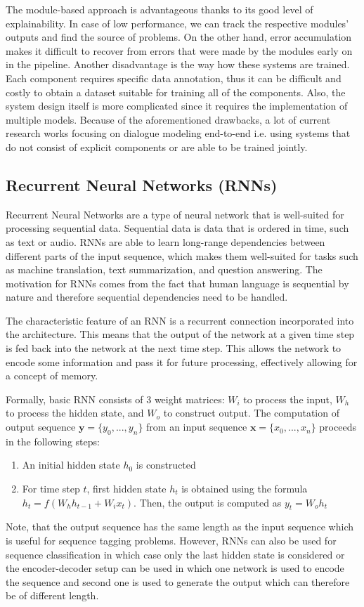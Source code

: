 The module-based approach is advantageous thanks to its good level of explainability.
In case of low performance, we can track the respective modules' outputs and find the source of problems.
On the other hand, error accumulation makes it difficult to recover from errors that were made by the modules early on in the pipeline.
Another disadvantage is the way how these systems are trained.
Each component requires specific data annotation, thus it can be difficult and costly to obtain a dataset suitable for training all of the components.
Also, the system design itself is more complicated since it requires the implementation of multiple models.
Because of the aforementioned drawbacks, a lot of current research works focusing on dialogue modeling end-to-end i.e. using systems that do not consist of explicit components or are able to be trained jointly.

\subsection{Recurrent Neural Networks (RNNs)}
Recurrent Neural Networks are a type of neural network that is well-suited for processing sequential data. Sequential data is data that is ordered in time, such as text or audio.
RNNs are able to learn long-range dependencies between different parts of the input sequence, which makes them well-suited for tasks such as machine translation, text summarization, and question answering.
The motivation for RNNs comes from the fact that human language is sequential by nature and therefore sequential dependencies need to be handled.

The characteristic feature of an RNN is a recurrent connection incorporated into the architecture.
This means that the output of the network at a given time step is fed back into the network at the next time step. This allows the network to encode some information and pass it for future processing, effectively allowing for a concept of memory.

Formally, basic RNN consists of 3 weight matrices: $W_{i}$ to process the input, $W_h$ to process the hidden state, and $W_o$ to construct output.
The computation of output sequence $\mathbf{y} = \{y_0, ..., y_n\}$ from an input sequence $\mathbf{x} = \{x_0, ..., x_n\}$ proceeds in the following steps:
\begin{enumerate}
    \item An initial hidden state $h_0$ is constructed
    \item For time step $t$, first hidden state $h_t$ is obtained using the formula $h_t = f(W_hh_{t-1} + W_ix_t)$. Then, the output is computed as $y_t = W_oh_t$
\end{enumerate}
Note, that the output sequence has the same length as the input sequence which is useful for sequence tagging problems.
However, RNNs can also be used for sequence classification in which case only the last hidden state is considered or the encoder-decoder setup can be used in which one network is used to encode the sequence and second one is used to generate the output which can therefore be of different length.

